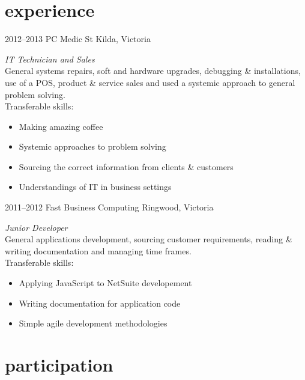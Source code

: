 \documentclass[]{friggeri-cv} %
\begin{document}
\section{experience}

\begin{entrylist}
\entry
{2012--2013}
{PC Medic}
{St Kilda, Victoria}
{\emph{IT Technician and Sales} \\
General systems repairs, soft and hardware upgrades, debugging \& installations, use of a POS, product \& service sales and used a systemic approach to general problem solving. \\
Transferable skills:
\begin{itemize}
    \item Making amazing coffee
    \item Systemic approaches to problem solving
    \item Sourcing the correct information from clients \& customers
    \item Understandings of IT in business settings
\end{itemize}}
\entry
{2011--2012}
{Fast Business Computing}
{Ringwood, Victoria}
{\emph{Junior Developer} \\
General applications development, sourcing customer requirements, reading \& writing documentation and managing time frames. \\
Transferable skills:
\begin{itemize}
    \item Applying JavaScript to NetSuite developement
    \item Writing documentation for application code
    \item Simple agile development methodologies
\end{itemize}
}
\end{entrylist}


\section{participation}
\end{document}
